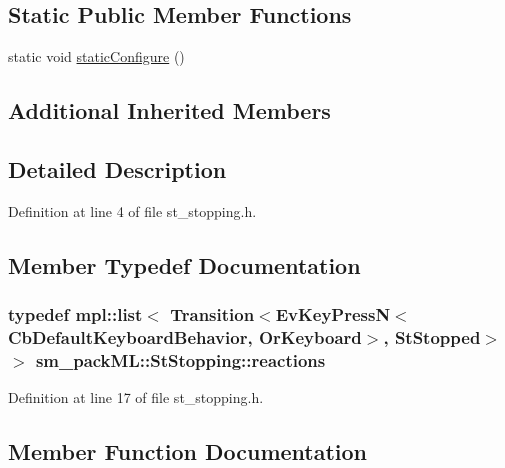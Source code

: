 \subsection*{Static Public Member Functions}
\begin{DoxyCompactItemize}
\item 
static void \hyperlink{structsm__packML_1_1StStopping_a58aa3dd672aeb0496ce2047da298c611}{static\+Configure} ()
\end{DoxyCompactItemize}
\subsection*{Additional Inherited Members}


\subsection{Detailed Description}


Definition at line 4 of file st\+\_\+stopping.\+h.



\subsection{Member Typedef Documentation}
\subsubsection[{\texorpdfstring{reactions}{reactions}}]{\setlength{\rightskip}{0pt plus 5cm}typedef mpl\+::list$<$ Transition$<$Ev\+Key\+PressN$<$Cb\+Default\+Keyboard\+Behavior, {\bf Or\+Keyboard}$>$, {\bf St\+Stopped}$>$ $>$ {\bf sm\+\_\+pack\+M\+L\+::\+St\+Stopping\+::reactions}}\hypertarget{structsm__packML_1_1StStopping_ade7d68af33bb4b9672601e4bb01a0bae}{}\label{structsm__packML_1_1StStopping_ade7d68af33bb4b9672601e4bb01a0bae}


Definition at line 17 of file st\+\_\+stopping.\+h.



\subsection{Member Function Documentation}
